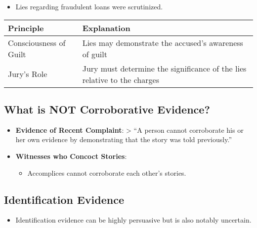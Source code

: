\begin{itemize}
\tightlist
\item
  Lies regarding fraudulent loans were scrutinized.
\end{itemize}

\begin{longtable}[]{@{}
  >{\raggedright\arraybackslash}p{}
  >{\raggedright\arraybackslash}p{}@{}}
\toprule\noalign{}
\begin{minipage}[b]{\linewidth}\raggedright
Principle
\end{minipage} & \begin{minipage}[b]{\linewidth}\raggedright
Explanation
\end{minipage} \\
\midrule\noalign{}
\endhead
\bottomrule\noalign{}
\endlastfoot
Consciousness of Guilt & Lies may demonstrate the accused's awareness of
guilt \\
Jury's Role & Jury must determine the significance of the lies relative
to the charges \\
\end{longtable}

\subsection{What is NOT Corroborative
Evidence?}\label{what-is-not-corroborative-evidence}

\begin{itemize}
\item
  \textbf{Evidence of Recent Complaint}: \textgreater{} ``A person
  cannot corroborate his or her own evidence by demonstrating that the
  story was told previously.''
\item
  \textbf{Witnesses who Concoct Stories}:

  \begin{itemize}
  \tightlist
  \item
    Accomplices cannot corroborate each other's stories.
  \end{itemize}
\end{itemize}

\subsection{Identification Evidence}\label{identification-evidence}

\begin{itemize}
\tightlist
\item
  Identification evidence can be highly persuasive but is also notably
  uncertain.
\end{itemize}

